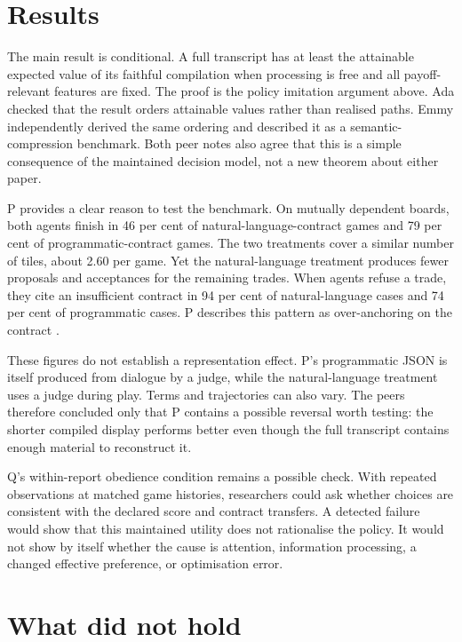 \documentclass{article}
\begin{document}
\section{Results}

The main result is conditional. A full transcript has at least the attainable expected value of its faithful compilation when processing is free and all payoff-relevant features are fixed. The proof is the policy imitation argument above. Ada checked that the result orders attainable values rather than realised paths. Emmy independently derived the same ordering and described it as a semantic-compression benchmark. Both peer notes also agree that this is a simple consequence of the maintained decision model, not a new theorem about either paper.

P provides a clear reason to test the benchmark. On mutually dependent boards, both agents finish in 46 per cent of natural-language-contract games and 79 per cent of programmatic-contract games. The two treatments cover a similar number of tiles, about 2.60 per game. Yet the natural-language treatment produces fewer proposals and acceptances for the remaining trades. When agents refuse a trade, they cite an insufficient contract in 94 per cent of natural-language cases and 74 per cent of programmatic cases. P describes this pattern as over-anchoring on the contract \cite{P}.

These figures do not establish a representation effect. P's programmatic JSON is itself produced from dialogue by a judge, while the natural-language treatment uses a judge during play. Terms and trajectories can also vary. The peers therefore concluded only that P contains a possible reversal worth testing: the shorter compiled display performs better even though the full transcript contains enough material to reconstruct it.

Q's within-report obedience condition remains a possible check. With repeated observations at matched game histories, researchers could ask whether choices are consistent with the declared score and contract transfers. A detected failure would show that this maintained utility does not rationalise the policy. It would not show by itself whether the cause is attention, information processing, a changed effective preference, or optimisation error.

\section{What did not hold}
\end{document}
